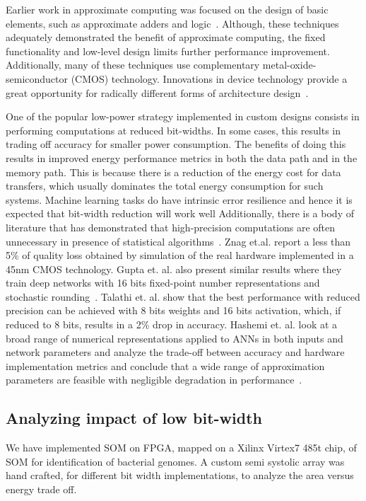 \documentclass[a4paper,10pt]{article}
\begin{document}
Earlier work in approximate computing was focused on the design of basic elements, such as approximate adders and logic~\cite{Gupta2012}.  Although, these techniques  adequately demonstrated the benefit of approximate computing,  the fixed functionality and low-level design limits further performance improvement. Additionally, many of these techniques use complementary metal-oxide-semiconductor (CMOS) technology. Innovations in   device technology  provide a great opportunity for radically different forms of architecture design~\cite{Venkataramani2012}.

One of the  popular low-power strategy implemented in custom designs consists in performing computations at reduced bit-widths. In some cases, this results in  trading off accuracy for smaller power consumption. The  benefits of doing this results in improved energy performance metrics in both the data path and in the memory path. This is because  there is a  reduction of the energy cost for data transfers, which usually dominates the total energy consumption for such systems. Machine learning tasks do have intrinsic error resilience  and hence it is expected that bit-width reduction will  work well Additionally, there is a body of literature that has demonstrated that high-precision computations are often unnecessary in presence of statistical algorithms~\cite{Moons2017,Zhang2015}. Znag et.al. report a less than 5\% of quality loss  obtained by simulation of the real hardware implemented in a 45nm CMOS technology. Gupta et. al. also present similar results where they train deep networks with 16 bits fixed-point number representations and stochastic rounding~\cite{Gupta2015}. Talathi et. al. show that  the best performance with reduced precision  can be  achieved with 8 bits weights and 16 bits activation, which, if reduced to 8 bits, results in  a 2\% drop in accuracy. Hashemi et. al. look at a broad range of numerical representations applied to ANNs in both inputs and network parameters and analyze the trade-off between accuracy and hardware implementation metrics and conclude that a wide range of approximation parameters are feasible with negligible degradation in performance~\cite{Hashemi2017}.

\subsection{Analyzing impact of low bit-width}
We have implemented SOM on FPGA, mapped on a Xilinx Virtex7 485t chip, of SOM for identification of bacterial genomes. A custom semi systolic array was hand crafted, for different bit width implementations, to analyze the area versus energy trade off.
\end{document}
